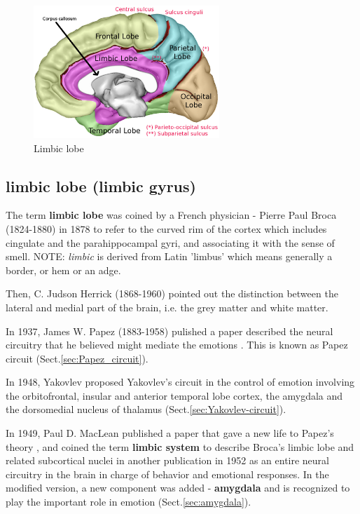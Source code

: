 \begin{figure}[hbt]
  \centerline{\includegraphics[height=5cm,
    angle=0]{./images/brain_lobes.eps}}
  \caption{Limbic lobe}
\label{fig:limbic_lobe}
\end{figure}

\subsection{limbic lobe (limbic gyrus)}
\label{sec:limbic-lobe}


\begin{mdframed}

The term {\bf limbic lobe} was coined by a French physician - Pierre Paul Broca
(1824-1880) in 1878 to refer to the curved rim of the cortex which includes
cingulate and the parahippocampal gyri, and associating it with the sense of
smell. NOTE: {\it limbic} is derived from Latin 'limbus' which means generally a
border, or hem or an adge.

Then, C. Judson Herrick (1868-1960) pointed out the distinction between the
lateral and medial part of the brain, i.e. the grey matter and white matter.

In 1937, James W. Papez (1883-1958) pulished a paper described the
neural circuitry that he believed might mediate the emotions \citep{papez1937}.
This is known as Papez circuit (Sect.\ref{sec:Papez_circuit}).

In 1948, Yakovlev proposed Yakovlev's circuit in the control of emotion
involving the orbitofrontal, insular and anterior temporal lobe cortex, the
amygdala and the dorsomedial nucleus of thalamus
(Sect.\ref{sec:Yakovlev-circuit}).

In 1949,  Paul D. MacLean published a paper that gave a new life to Papez's
theory \citep{MacLean1949}, and coined the term {\bf limbic system} to describe
Broca's limbic lobe and related subcortical nuclei in another publication in
1952 as an entire neural circuitry in the brain in charge of behavior and
emotional responses. In the modified version, a new component was added - {\bf
amygdala} and is recognized to play the important role in emotion
(Sect.\ref{sec:amygdala}).
\end{mdframed}

